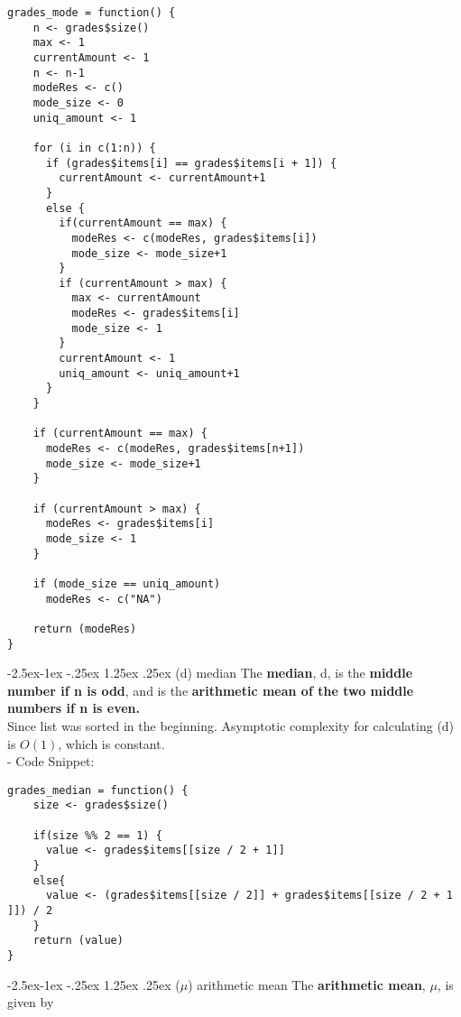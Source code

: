 \documentclass[11pt]{article}
\makeatletter
\renewcommand\paragraph{\@startsection{paragraph}{4}{\z@}%
            {-2.5ex\@plus -1ex \@minus -.25ex}%
            {1.25ex \@plus .25ex}%
            {\normalfont\normalsize\bfseries}}
\makeatother
\begin{document}
\begin{lstlisting}
grades_mode = function() {
    n <- grades$size()
    max <- 1
    currentAmount <- 1
    n <- n-1
    modeRes <- c()
    mode_size <- 0
    uniq_amount <- 1
    
    for (i in c(1:n)) {
      if (grades$items[i] == grades$items[i + 1]) {
        currentAmount <- currentAmount+1
      }
      else {
        if(currentAmount == max) {
          modeRes <- c(modeRes, grades$items[i])
          mode_size <- mode_size+1
        }
        if (currentAmount > max) {
          max <- currentAmount
          modeRes <- grades$items[i]
          mode_size <- 1
        }
        currentAmount <- 1
        uniq_amount <- uniq_amount+1
      }
    }
    
    if (currentAmount == max) {
      modeRes <- c(modeRes, grades$items[n+1])
      mode_size <- mode_size+1
    }
    
    if (currentAmount > max) {
      modeRes <- grades$items[i]
      mode_size <- 1
    }
    
    if (mode_size == uniq_amount)
      modeRes <- c("NA")
    
    return (modeRes)
}
\end{lstlisting}

\paragraph{(d) median}
The \textbf{median}, d, is the \textbf{middle number if n is odd}, and is the \textbf{arithmetic mean of the two middle numbers if n is even.}\\

Since list was sorted in the beginning. Asymptotic complexity for calculating (d) is $O(1)$, which is constant.\\

- Code Snippet:\\

\begin{lstlisting}
grades_median = function() {
    size <- grades$size()
    
    if(size %% 2 == 1) {
      value <- grades$items[[size / 2 + 1]]
    }
    else{
      value <- (grades$items[[size / 2]] + grades$items[[size / 2 + 1 ]]) / 2
    }
    return (value)
}
\end{lstlisting}

\paragraph{($\mu$) arithmetic mean}
The \textbf{arithmetic mean}, $\mu$, is given by
\end{document}
